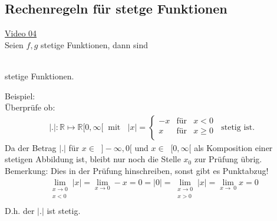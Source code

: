 \subsection{Rechenregeln für stetge Funktionen}
\href{https://youtu.be/hV8uqmwoxiI}{Video 04}\\
Seien $ f,g $ stetige Funktionen, dann sind\\
\begin{center}
	\vspace*{4mm}\\
	stetige Funktionen.
\end{center}
Beispiel:\\
Überprüfe ob:\\
\begin{align*}
|.|:\mathbb{R}\longmapsto \mathbb{R} [0,\infty[\;\;\text{mit }\;\;|x| =     \left\{ \begin{array}{rcl}
-x & \mbox{für} & x<0\\
x & \mbox{für} & x\geq 0 \\
\end{array}\right.\;\;\text{stetig ist. }
\end{align*}
Da der Betrag $ |.| $ für $ x\in \;\; ]-\infty,0[ $ und $ x\in \;\; [0,\infty[  $ als Komposition einer stetigen Abbildung ist, bleibt nur noch die Stelle $ x_0 $ zur Prüfung übrig.\\
Bemerkung: Dies in der Prüfung hinschreiben, sonst gibt es Punktabzug!\\
\begin{align*}
\lim\limits_ {\substack{x\to 0\\x<0}}|x|=\lim\limits_ {x\to 0}-x=0=|0|=\lim\limits_ {\substack{x\to 0\\x>0}}|x|=\lim\limits_ {x\to\ 0}x=0\\
\end{align*}
D.h. der $ |.| $ ist stetig.\\
